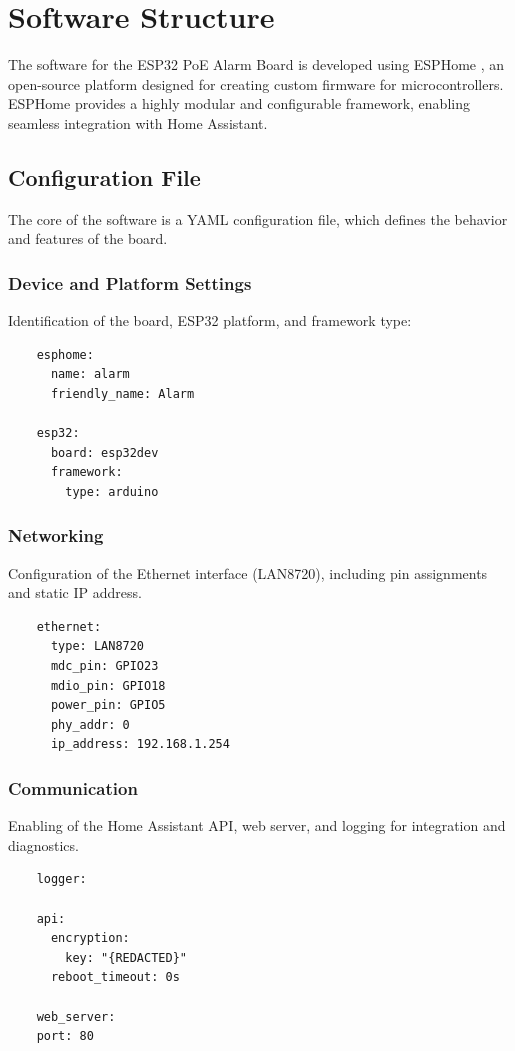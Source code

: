 \documentclass[a4paper,12pt]{article}
\begin{document}
\newpage
\section{Software Structure}
The software for the ESP32 PoE Alarm Board is developed using ESPHome \cite{ESPHomeSmartHome}, an open-source platform designed for creating custom firmware for microcontrollers. ESPHome provides a highly modular and configurable framework, enabling seamless integration with Home Assistant.

\subsection{Configuration File}
The core of the software is a YAML configuration file, which defines the behavior and features of the board. 

\subsubsection{Device and Platform Settings}
Identification of the board, ESP32 platform, and framework type:

\begin{lstlisting}
    esphome:
      name: alarm
      friendly_name: Alarm

    esp32:
      board: esp32dev
      framework:
        type: arduino
\end{lstlisting}

\subsubsection{Networking}
Configuration of the Ethernet interface (LAN8720), including pin assignments and static IP address.

\begin{lstlisting}
    ethernet:
      type: LAN8720
      mdc_pin: GPIO23
      mdio_pin: GPIO18
      power_pin: GPIO5
      phy_addr: 0
      ip_address: 192.168.1.254
\end{lstlisting}

\subsubsection{Communication}
Enabling of the Home Assistant API, web server, and logging for integration and diagnostics.

\begin{lstlisting}
    logger:

    api:
      encryption:
        key: "{REDACTED}"
      reboot_timeout: 0s

    web_server:
    port: 80
\end{lstlisting}
\end{document}
